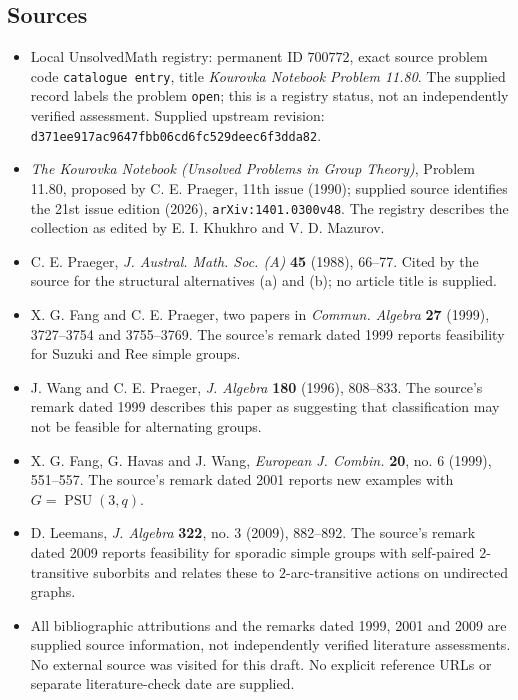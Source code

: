 \documentclass[11pt]{article}
\begin{document}
\subsection{Sources}
\begin{itemize}
\item Local UnsolvedMath registry: permanent ID \(700772\), exact source problem code \texttt{catalogue entry}, title \emph{Kourovka Notebook Problem 11.80}. The supplied record labels the problem \texttt{open}; this is a registry status, not an independently verified assessment. Supplied upstream revision: \texttt{d371ee917ac9647fbb06cd6fc529deec6f3dda82}.
\item \emph{The Kourovka Notebook (Unsolved Problems in Group Theory)}, Problem 11.80, proposed by C. E. Praeger, 11th issue (1990); supplied source identifies the 21st issue edition (2026), \texttt{arXiv:1401.0300v48}. The registry describes the collection as edited by E. I. Khukhro and V. D. Mazurov.
\item C. E. Praeger, \emph{J. Austral. Math. Soc. (A)} \textbf{45} (1988), 66--77. Cited by the source for the structural alternatives (a) and (b); no article title is supplied.
\item X. G. Fang and C. E. Praeger, two papers in \emph{Commun. Algebra} \textbf{27} (1999), 3727--3754 and 3755--3769. The source's remark dated 1999 reports feasibility for Suzuki and Ree simple groups.
\item J. Wang and C. E. Praeger, \emph{J. Algebra} \textbf{180} (1996), 808--833. The source's remark dated 1999 describes this paper as suggesting that classification may not be feasible for alternating groups.
\item X. G. Fang, G. Havas and J. Wang, \emph{European J. Combin.} \textbf{20}, no. 6 (1999), 551--557. The source's remark dated 2001 reports new examples with \(G=\operatorname{PSU}(3,q)\).
\item D. Leemans, \emph{J. Algebra} \textbf{322}, no. 3 (2009), 882--892. The source's remark dated 2009 reports feasibility for sporadic simple groups with self-paired \(2\)-transitive suborbits and relates these to \(2\)-arc-transitive actions on undirected graphs.
\item All bibliographic attributions and the remarks dated 1999, 2001 and 2009 are supplied source information, not independently verified literature assessments. No external source was visited for this draft. No explicit reference URLs or separate literature-check date are supplied.
\end{itemize}
\end{document}
